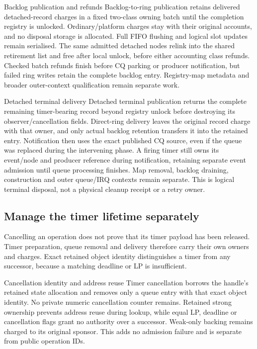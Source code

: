 \begin{implementationdetail}{Backlog publication and refunds}
Backlog-to-ring publication retains delivered detached-record charges in a
fixed two-class owning batch until the completion registry is unlocked.
Ordinary/platform charges stay with their original accounts, and no disposal storage
is allocated. Full FIFO flushing and logical slot updates remain serialised.
The same admitted detached nodes relink into the shared retirement list and
free after local unlock, before either accounting class refunds.
Checked batch refunds finish before CQ parking or producer notification, but
failed ring writes retain the complete backlog entry. Registry-map metadata
and broader outer-context qualification remain separate work.
\end{implementationdetail}

\begin{implementationdetail}{Detached terminal delivery}
Detached terminal publication returns the complete remaining timer-bearing
record beyond registry unlock before destroying its observer/cancellation
fields. Direct-ring delivery leaves the original record charge with that owner, and
only actual backlog retention transfers it into the retained entry. Notification
then uses the exact published CQ source, even if the queue was replaced during
the intervening phase. A firing timer still owns its event/node and producer
reference during notification, retaining separate event admission until queue
processing finishes. Map removal, backlog draining, construction and outer
queue/IRQ contexts remain separate. This is logical terminal disposal, not a
physical cleanup receipt or a retry owner.
\end{implementationdetail}

\subsection{Manage the timer lifetime separately}

Cancelling an operation does not prove that its timer payload has been released.
Timer preparation, queue removal and delivery therefore carry their own owners
and charges. Exact retained object identity distinguishes a timer from any
successor, because a matching deadline or LP is insufficient.

\begin{implementationdetail}{Cancellation identity and address reuse}
Timer cancellation borrows the handle's retained state allocation and removes
only a queue entry with that exact object identity. No private numeric
cancellation counter remains. Retained strong ownership prevents address reuse
during lookup, while equal LP, deadline or cancellation flags grant no authority over
a successor. Weak-only backing remains charged to its original sponsor.
This adds no admission failure and is separate from public operation IDs.
\end{implementationdetail}

